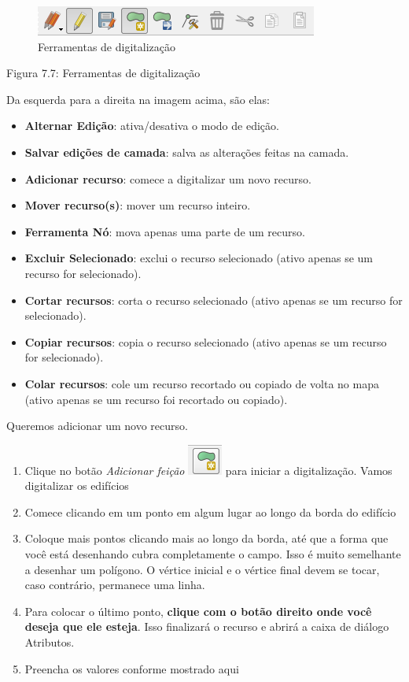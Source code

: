 \documentclass[
  portuguese,
]{krantz}
\providecommand{\tightlist}{%
  \setlength{\itemsep}{0pt}\setlength{\parskip}{0pt}}
\begin{document}
\begin{figure}
\centering
\includegraphics{media/modulo7/digi-toolbar.png}
\caption{Ferramentas de digitalização}
\end{figure}

Figura 7.7: Ferramentas de digitalização

Da esquerda para a direita na imagem acima, são elas:

\begin{itemize}
\tightlist
\item
  \textbf{Alternar Edição}: ativa/desativa o modo de edição.
\item
  \textbf{Salvar edições de camada}: salva as alterações feitas na camada.
\item
  \textbf{Adicionar recurso}: comece a digitalizar um novo recurso.
\item
  \textbf{Mover recurso(s)}: mover um recurso inteiro.
\item
  \textbf{Ferramenta Nó}: mova apenas uma parte de um recurso.
\item
  \textbf{Excluir Selecionado}: exclui o recurso selecionado (ativo apenas se um recurso for selecionado).
\item
  \textbf{Cortar recursos}: corta o recurso selecionado (ativo apenas se um recurso for selecionado).
\item
  \textbf{Copiar recursos}: copia o recurso selecionado (ativo apenas se um recurso for selecionado).
\item
  \textbf{Colar recursos}: cole um recurso recortado ou copiado de volta no mapa (ativo apenas se um recurso foi recortado ou copiado).
\end{itemize}

Queremos adicionar um novo recurso.

\begin{enumerate}
\def\labelenumi{\arabic{enumi}.}
\setcounter{enumi}{10}
\tightlist
\item
  Clique no botão \emph{Adicionar feição} \includegraphics{media/modulo7/add-feature.png} para iniciar a digitalização. Vamos digitalizar os edifícios
\item
  Comece clicando em um ponto em algum lugar ao longo da borda do edifício
\item
  Coloque mais pontos clicando mais ao longo da borda, até que a forma que você está desenhando cubra completamente o campo. Isso é muito semelhante a desenhar um polígono. O vértice inicial e o vértice final devem se tocar, caso contrário, permanece uma linha.
\item
  Para colocar o último ponto, \textbf{clique com o botão direito onde você deseja que ele esteja}. Isso finalizará o recurso e abrirá a caixa de diálogo Atributos.
\item
  Preencha os valores conforme mostrado aqui
\end{enumerate}
\end{document}
